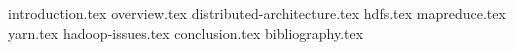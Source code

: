 \documentclass[a4paper,12pt]{article}
\begin{document}
 
 
 
 

{introduction.tex}
{overview.tex}
{distributed-architecture.tex}
{hdfs.tex}
{mapreduce.tex}
{yarn.tex}
{hadoop-issues.tex}
{conclusion.tex}
{bibliography.tex}
 
\end{document}
